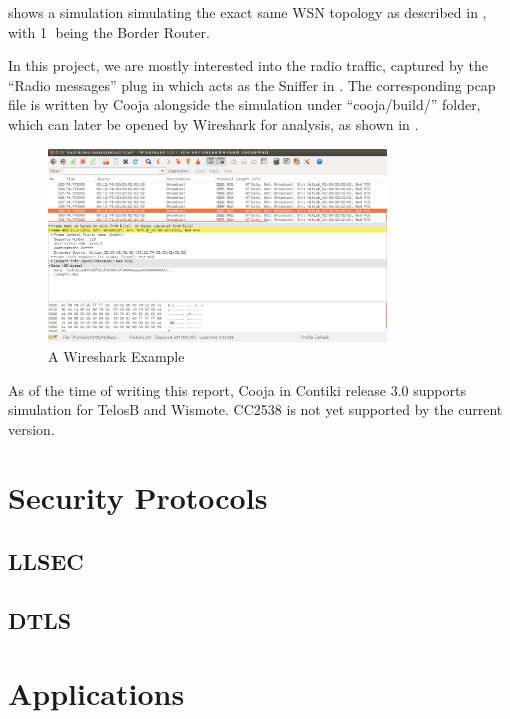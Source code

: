  shows a simulation simulating the exact same WSN topology as described in , with \textcircled{1} being the Border Router. 

In this project, we are mostly interested into the radio traffic, captured by the ``Radio messages'' plug in which acts as the Sniffer in . The corresponding pcap file is written by Cooja alongside the simulation under ``cooja/build/'' folder, which can later be opened by Wireshark\cite{Wireshark} for analysis, as shown in .

\begin{figure}[h!]
	\center
	\includegraphics[width=0.8\textwidth]{fig/wireshark_example.png}
	\caption{A Wireshark Example}
	\label{Fig: A Wireshark Example}
\end{figure}

As of the time of writing this report, Cooja in Contiki release 3.0 supports simulation for TelosB and Wismote. CC2538 is not yet supported by the current version.

\section{Security Protocols}
\subsection{LLSEC}

\subsection{DTLS}

\section{Applications}


